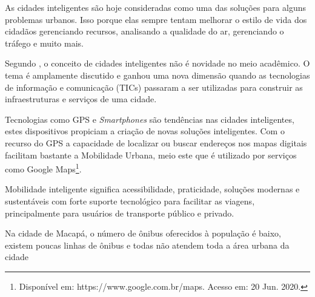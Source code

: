 As cidades inteligentes são hoje consideradas como uma das soluções para alguns problemas urbanos. Isso porque elas sempre tentam melhorar o estilo de vida dos cidadãos gerenciando recursos, analisando a qualidade do ar, gerenciando o tráfego e muito mais. 

Segundo , o conceito de cidades inteligentes não é novidade no meio acadêmico. O tema é amplamente discutido e ganhou uma nova dimensão quando as tecnologias de informação e comunicação (TICs) passaram a ser utilizadas para construir as infraestruturas e serviços de uma cidade.

Tecnologias como GPS e \textit{Smartphones} são tendências nas cidades inteligentes, estes dispositivos propiciam a criação de novas soluções inteligentes. Com o recurso do GPS a capacidade de localizar ou buscar endereços nos mapas digitais facilitam bastante a Mobilidade Urbana, meio este que é utilizado por serviços como Google Maps\footnote{Disponível em: https://www.google.com.br/maps. Acesso em: 20 Jun. 2020.}.

Mobilidade inteligente significa acessibilidade, praticidade, soluções modernas e sustentáveis com forte suporte tecnológico para facilitar as viagens, principalmente para usuários de transporte público e privado.

Na cidade de Macapá, o número de ônibus oferecidos à população é baixo, existem poucas linhas de ônibus e todas não atendem toda a área urbana da cidade \cite{sau2018}

